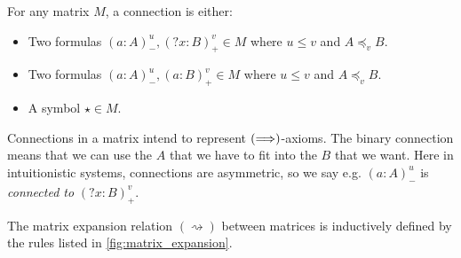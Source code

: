 \documentclass[twoside]{report}
\begin{document}
\begin{definition}
    \label{def:matrix_connections}
    For any matrix $M$, a connection is either:
    \begin{itemize}[noitemsep]
        \item Two formulas $(a : A)^u_-, ({?x} : B)^v_+ \in M$ where $u \leq v$ and $A \preceq_v B$.
        \item Two formulas $(a : A)^u_-, (a : B)^v_+ \in M$ where $u \leq v$ and $A \preceq_v B$.
        \item A symbol $\star \in M$.
    \end{itemize}
\end{definition}

Connections in a matrix intend to represent $(\Longrightarrow)$-axioms. The binary connection means that we can use the $A$ that we have to fit into the $B$ that we want. Here in intuitionistic systems, connections are asymmetric, so we say e.g. $(a : A)^u_-$ is \emph{connected to} $({?x} : B)^v_+$.

\begin{definition}
    \label{def:matrix_expansions}
    The matrix expansion relation $(\rightsquigarrow)$ between matrices is inductively defined by the rules listed in \cref{fig:matrix_expansion}.
\end{definition}
\end{document}
